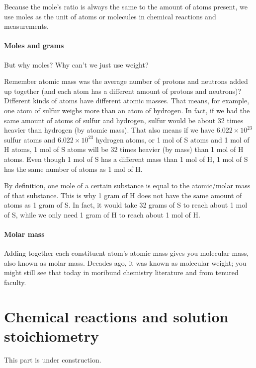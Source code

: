 \documentclass[letterpaper, 12pt]{article}
\begin{document}
Because the mole's ratio is always the same to the amount of atoms present, we use moles as the unit of atoms or molecules in chemical reactions and measurements.

	\subsection{Moles and grams}
	But why moles? Why can't we just use weight?
	
	Remember atomic mass was the average number of protons and neutrons added up together (and each atom has a different amount of protons and neutrons)? Different kinds of atoms have different atomic masses. That means, for example, one atom of sulfur weighs more than an atom of hydrogen. In fact, if we had the same amount of atoms of sulfur and hydrogen, sulfur would be about 32 times heavier than hydrogen (by atomic mass). That also means if we have $6.022 \times 10^{23}$ sulfur atoms and $6.022 \times 10^{23}$ hydrogen atoms, or 1 mol of S atoms and 1 mol of H atoms, 1 mol of S atoms will be 32 times heavier (by mass) than 1 mol of H atoms. Even though 1 mol of S has a different mass than 1 mol of H, 1 mol of S has the same number of atoms as 1 mol of H.
	
	By definition, one mole of a certain substance is equal to the atomic/molar mass of that substance. This is why 1 gram of H does not have the same amount of atoms as 1 gram of S. In fact, it would take 32 grams of S to reach about 1 mol of S, while we only need 1 gram of H to reach about 1 mol of H.

	\subsection{Molar mass}
	Adding together each constituent atom's atomic mass gives you molecular mass, also known as molar mass. Decades ago, it was known as molecular weight; you might still see that today in moribund chemistry literature and from tenured faculty.

\clearpage

\part{Chemical reactions and solution stoichiometry}
This part is under construction.


\end{document}
